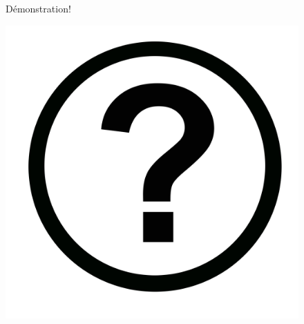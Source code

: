 \documentclass[compress,pdf,11pt,xcolor=dvipsnames]{beamer}
\begin{document}
\begin{frame}{}
  \begin{figure}
    \begin{centering}
      \Huge Démonstration!
      \par\end{centering}
  \end{figure}
\end{frame}

% 
% 
\begin{frame}{}
  \begin{figure}
    \begin{centering}
      \includegraphics[scale=0.1]{img/Icon-round-Question_mark.jpg}
      \par\end{centering}
  \end{figure}
\end{frame}
\end{document}

